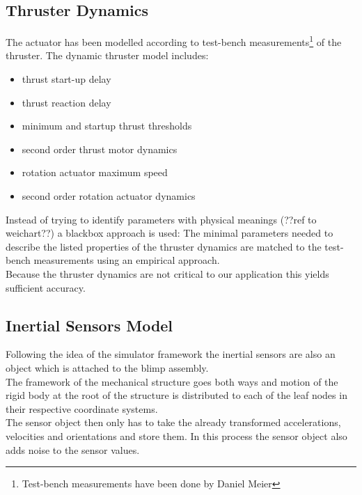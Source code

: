 \subsection{Thruster Dynamics}
\label{sub:thrust_dynamics}
The actuator has been modelled according to test-bench measurements\footnote{Test-bench measurements have been done by Daniel Meier} of the thruster.
The dynamic thruster model includes:
\begin{itemize}
\item thrust start-up delay
\item thrust reaction delay
\item minimum and startup thrust thresholds
\item second order thrust motor dynamics
\item rotation actuator maximum speed
\item second order rotation actuator dynamics
\end{itemize}
Instead of trying to identify parameters with physical meanings (??ref to weichart??) a blackbox approach is used:
The minimal parameters needed to describe the listed properties of the thruster dynamics are matched to the test-bench measurements using an empirical approach.  \\
Because the thruster dynamics are not critical to our application this yields sufficient accuracy.

\subsection{Inertial Sensors Model}
\label{sub:imu_model}
Following the idea of the simulator framework the inertial sensors are also an object which is attached to the blimp assembly. \\
The framework of the mechanical structure goes both ways and motion of the rigid body at the root of the structure is distributed to each of the leaf nodes in their respective coordinate systems. \\
The sensor object then only has to take the already transformed accelerations, velocities and orientations and store them.
In this process the sensor object also adds noise to the sensor values.

